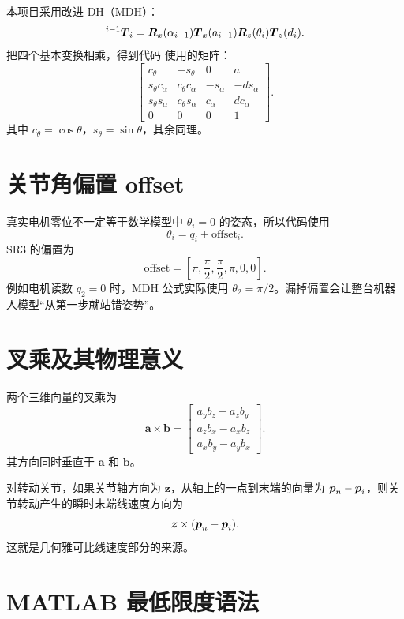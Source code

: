 本项目采用改进 DH（MDH）：
\[
{}^{i-1}\boldsymbol{T}_i=
\boldsymbol{R}_x(\alpha_{i-1})
\boldsymbol{T}_x(a_{i-1})
\boldsymbol{R}_z(\theta_i)
\boldsymbol{T}_z(d_i).
\]
把四个基本变换相乘，得到代码  使用的矩阵：
\[
\begin{bmatrix}
c_\theta&-s_\theta&0&a\\
s_\theta c_\alpha&c_\theta c_\alpha&-s_\alpha&-d s_\alpha\\
s_\theta s_\alpha&c_\theta s_\alpha&c_\alpha&d c_\alpha\\
0&0&0&1
\end{bmatrix}.
\]
其中 $c_\theta=\cos\theta$，$s_\theta=\sin\theta$，其余同理。

\section{关节角偏置 offset}

真实电机零位不一定等于数学模型中 $\theta_i=0$ 的姿态，所以代码使用
\[
\theta_i=q_i+\mathrm{offset}_i.
\]
SR3 的偏置为
\[
\mathrm{offset}=
\left[\pi,\frac{\pi}{2},\frac{\pi}{2},\pi,0,0\right].
\]
例如电机读数 $q_2=0$ 时，MDH 公式实际使用
$\theta_2=\pi/2$。漏掉偏置会让整台机器人模型“从第一步就站错姿势”。

\section{叉乘及其物理意义}

两个三维向量的叉乘为
\[
\boldsymbol{a}\times\boldsymbol{b}=
\begin{bmatrix}
a_yb_z-a_zb_y\\
a_zb_x-a_xb_z\\
a_xb_y-a_yb_x
\end{bmatrix}.
\]
其方向同时垂直于 $\boldsymbol{a}$ 和 $\boldsymbol{b}$。

对转动关节，如果关节轴方向为 $\boldsymbol{z}$，从轴上的一点到末端的向量为
$\boldsymbol{p}_n-\boldsymbol{p}_i$，则关节转动产生的瞬时末端线速度方向为
\[
\boldsymbol{z}\times(\boldsymbol{p}_n-\boldsymbol{p}_i).
\]
这就是几何雅可比线速度部分的来源。

\section{MATLAB 最低限度语法}

